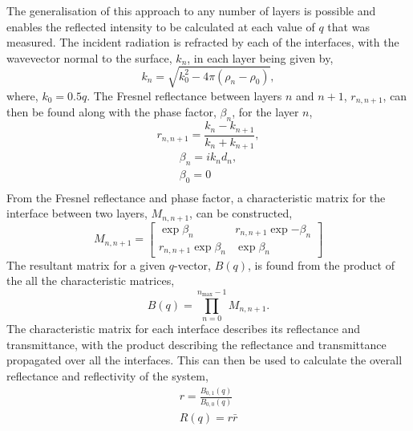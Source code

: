 \documentclass[
 reprint,
 superscriptaddress,
 amsmath,amssymb,
 aps,
]{revtex4-1}
\begin{document}
The generalisation of this approach to any number of layers is possible and enables the reflected intensity to be calculated at each value of $q$ that was measured.
The incident radiation is refracted by each of the interfaces, with the wavevector normal to the surface, $k_n$, in each layer being given by,
%
\begin{equation}
    k_n = \sqrt{k_0^2 - 4\pi(\rho_n - \rho_0)},
\end{equation}
%
where, $k_0 = 0.5q$.
The Fresnel reflectance between layers $n$ and $n+1$, $r_{n, n+1}$, can then be found along with the phase factor, $\beta_n$, for the layer $n$,
%
\begin{equation}
    r_{n, n+1} = \frac{k_n - k_{n+1}}{k_n + k_{n+1}},
    \label{equ:fres}
\end{equation}
%
%
\begin{equation}
\begin{aligned}
\beta_n = ik_nd_n, \\
\beta_0 = 0 \\
\end{aligned}
\end{equation}
%
From the Fresnel reflectance and phase factor, a characteristic matrix for the interface between two layers, $M_{n, n+1}$, can be constructed,
%
\begin{equation}
    M_{n, n+1} =
    \begin{bmatrix}
        \exp{\beta_n} & r_{n,n+1}\exp{-\beta_n} \\
        r_{n,n+1}\exp{\beta_n} & \exp{\beta_n}
    \end{bmatrix}
\end{equation}
%
The resultant matrix for a given $q$-vector, $B(q)$, is found from the product of the all the characteristic matrices,
%
\begin{equation}
    B(q) = \prod_{n=0}^{n_{\text{max}}-1}{M_{n, n+1}}.
\end{equation}
The characteristic matrix for each interface describes its reflectance and transmittance, with the product describing the reflectance and transmittance propagated over all the interfaces. This can then be used to calculate the overall reflectance and reflectivity of the system,
%
\begin{equation}
\begin{aligned}
    r =  \frac{B_{0,1}(q)}{B_{0,0}(q)} \\
    R(q) = r\bar r
\end{aligned}
\end{equation}
%
\end{document}
